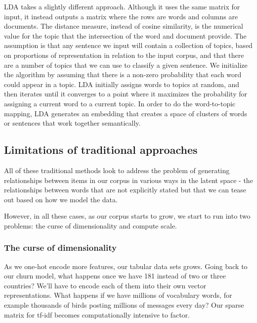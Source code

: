 \documentclass[11pt, table]{diazessay} %
\begin{document}
\begin{sloppypar}
LDA takes a slightly different approach. Although it uses the same matrix for input, it instead outputs a matrix where the rows are words and columns are documents. The distance measure, instead of cosine similarity, is the numerical value for the topic that the intersection of the word and document provide.  The assumption is that any sentence we input will contain a collection of topics, based on proportions of representation in relation to the input corpus, and that there are a number of topics that we can use to classify a given sentence. We initialize the algorithm by assuming that there is a non-zero probability that each word could appear in a topic. LDA initially assigns words to topics at random, and then iterates until it converges to a point where it maximizes the probability for assigning a current word to a current topic.  In order to do the word-to-topic mapping, LDA generates an embedding that creates a space of clusters of words or sentences that work together semantically. 

\subsection{Limitations of traditional approaches}
 
 All of these traditional methods look to address the problem of generating relationships between items in our corpus in various ways in the latent space - the relationships between words that are not explicitly stated but that we can tease out based on how we model the data. 
 
 However, in all these cases, as our corpus starts to grow, we start to run into two problems: the curse of dimensionality and compute scale. 
 
 \subsubsection{The curse of dimensionality}

As we one-hot encode more features, our tabular data sets grows. Going back to our churn model,  what happens once we have 181 instead of two or three countries? We'll have to encode each of them  into their own vector representations. What happens if we have millions of vocabulary words, for example thousands of birds posting millions of messages every day? Our sparse matrix for tf-idf becomes computationally intensive to factor. 


\end{sloppypar}
\end{document}
